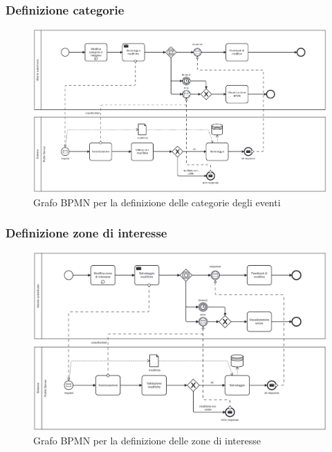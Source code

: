 \documentclass{article}
\begin{document}
\clearpage

\subsubsection{Definizione categorie}

\begin{figure}[htbp]
    \label{7.1.5}
    \centering
    \includegraphics[width=1\textwidth]{Images/BPMN - categories.png}
    \caption{Grafo BPMN per la definizione delle categorie degli eventi}
\end{figure}

\clearpage

\subsubsection{Definizione zone di interesse}

\begin{figure}[htbp]
    \label{7.1.6}
    \centering
    \includegraphics[width=1\textwidth]{Images/BPMN - zone.png}
    \caption{Grafo BPMN per la definizione delle zone di interesse}
\end{figure}
\clearpage
\end{document}
